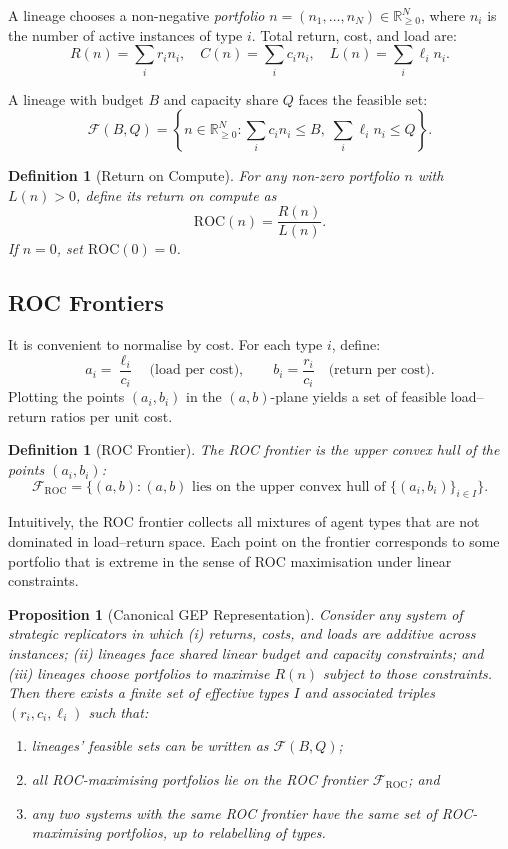 \documentclass[12pt]{article}
\newtheorem{proposition}[theorem]{Proposition}
\newtheorem{definition}[theorem]{Definition}
\newcommand{\ROC}{\mathrm{ROC}}
\newcommand{\R}{\mathbb{R}}
\begin{document}
A lineage chooses a non-negative \emph{portfolio} $n = (n_1, \ldots, n_N) \in \R^N_{\geq 0}$, where $n_i$ is the number of active instances of type $i$. Total return, cost, and load are:
\[
R(n) = \sum_i r_i n_i, \quad C(n) = \sum_i c_i n_i, \quad L(n) = \sum_i \ell_i n_i.
\]

A lineage with budget $B$ and capacity share $Q$ faces the feasible set:
\[
\mathcal{F}(B, Q) = \left\{ n \in \R^N_{\geq 0} : \sum_i c_i n_i \leq B, \; \sum_i \ell_i n_i \leq Q \right\}.
\]

\begin{definition}[Return on Compute]
For any non-zero portfolio $n$ with $L(n) > 0$, define its return on compute as
\[
\ROC(n) = \frac{R(n)}{L(n)}.
\]
If $n = 0$, set $\ROC(0) = 0$.
\end{definition}

\subsection{ROC Frontiers}

It is convenient to normalise by cost. For each type $i$, define:
\[
a_i = \frac{\ell_i}{c_i} \quad \text{(load per cost)}, \qquad b_i = \frac{r_i}{c_i} \quad \text{(return per cost)}.
\]
Plotting the points $(a_i, b_i)$ in the $(a, b)$-plane yields a set of feasible load--return ratios per unit cost.

\begin{definition}[ROC Frontier]
The \emph{ROC frontier} is the upper convex hull of the points $(a_i, b_i)$:
\[
\mathcal{F}_{\ROC} = \{(a, b) : (a, b) \text{ lies on the upper convex hull of } \{(a_i, b_i)\}_{i \in I}\}.
\]
\end{definition}

Intuitively, the ROC frontier collects all mixtures of agent types that are not dominated in load--return space. Each point on the frontier corresponds to some portfolio that is extreme in the sense of ROC maximisation under linear constraints.

\begin{proposition}[Canonical GEP Representation]
\label{prop:canonical}
Consider any system of strategic replicators in which (i) returns, costs, and loads are additive across instances; (ii) lineages face shared linear budget and capacity constraints; and (iii) lineages choose portfolios to maximise $R(n)$ subject to those constraints. Then there exists a finite set of effective types $I$ and associated triples $(r_i, c_i, \ell_i)$ such that:
\begin{enumerate}
    \item lineages' feasible sets can be written as $\mathcal{F}(B, Q)$;
    \item all ROC-maximising portfolios lie on the ROC frontier $\mathcal{F}_{\ROC}$; and
    \item any two systems with the same ROC frontier have the same set of ROC-maximising portfolios, up to relabelling of types.
\end{enumerate}
\end{proposition}
\end{document}
